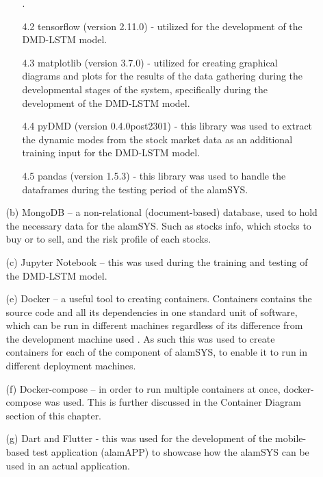 \begin{itemize}
\begin{itemize}
\begin{itemize}
                    \cite{GeekforGeeks_numpyVSlist}.
                    \item[4.2] tensorflow (version 2.11.0) - utilized for the development of 
                    the DMD-LSTM model.
                    \item[4.3] matplotlib (version 3.7.0) - utilized for creating 
                    graphical diagrams and plots for the results of the data 
                    gathering during the developmental stages of the system, 
                    specifically during the development of the DMD-LSTM model.
                    \item[4.4] pyDMD (version 0.4.0post2301) - this library was used to extract 
                    the dynamic modes from the stock market data as an additional 
                    training input for the DMD-LSTM model.
                    \item[4.5] pandas (version 1.5.3) - this library was used to 
                    handle the dataframes during the testing period of the alamSYS.
                \end{itemize}
            \item[(b)] MongoDB – a non-relational (document-based) database, 
            used to hold the necessary data for the alamSYS. Such as stocks info, which stocks to buy or to sell, 
            and the risk profile of each stocks.
            \item[(c)] Jupyter Notebook – this was used during the training and testing of 
            the DMD-LSTM model.
            \item[(e)] Docker – a useful tool to creating containers.
            Containers contains the source code and all its dependencies in one standard unit of software, 
            which can be run in different machines regardless of its difference from the development machine 
            used \cite{Docker}.
            As such this was used to create containers for each of the component of alamSYS, 
            to enable it to run in different deployment machines.
            \item[(f)] Docker-compose – in order to run multiple containers at once, 
            docker-compose was used. This is further discussed in the Container Diagram 
            section of this chapter.
            \item[(g)] Dart and Flutter - this was used for the development of the mobile-based 
            test application (alamAPP) to showcase how the alamSYS can be used in an actual application. 

\end{itemize}
\end{itemize}
